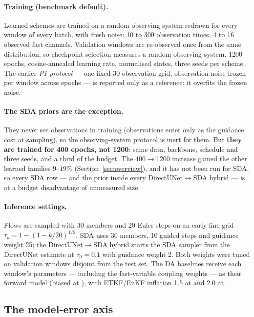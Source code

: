 \paragraph{Training (benchmark default).} Learned schemes are trained on a random
observing system redrawn for every window of every batch, with fresh noise: 10 to
300 observation times, 4 to 16 observed fast channels. Validation windows are
re-observed once from the same distribution, so checkpoint selection measures a
random observing system. 1200 epochs, cosine-annealed learning rate, normalised
states, three seeds per scheme. The earlier \emph{P1 protocol} --- one fixed
30-observation grid, observation noise frozen per window across epochs --- is
reported only as a reference: it overfits the frozen noise.

\paragraph{The SDA priors are the exception.} They never see observations in
training (observations enter only as the guidance cost at sampling), so the
observing-system protocol is inert for them. But \textbf{they are trained for 400
epochs, not 1200}: same data, backbone, schedule and three seeds, and a third of
the budget. The 400$\to$1200 increase gained the other learned families
$9$--$19\%$ (Section~\ref{sec:overview}), and it has not been run for SDA, so
every SDA row --- and the prior inside every DirectUNet$\to$SDA hybrid --- is
at a budget disadvantage of unmeasured size.

\paragraph{Inference settings.} Flows are sampled with 30 members and 20 Euler
steps on an early-fine grid $\tau_k = 1-(1-k/20)^{1/2}$. SDA uses 30 members, 10
guided steps and guidance weight 25; the DirectUNet$\to$SDA hybrid starts the SDA
sampler from the DirectUNet estimate at $\tau_0 = 0.1$ with guidance weight 2. Both
weights were tuned on validation windows disjoint from the test set. The DA
baselines receive each window's parameters --- including the fast-variable
coupling weights --- as their forward model (biased at \So{}), with ETKF/EnKF
inflation 1.5 at \Sz{} and 2.0 at \So{}.

\subsection{The model-error axis}
\label{sec:s0s1}

